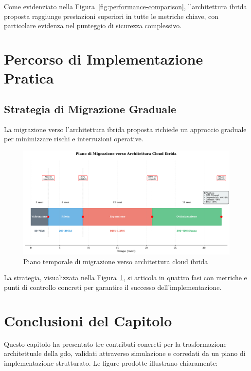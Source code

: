 Come evidenziato nella Figura~\ref{fig:performance-comparison}, l'architettura ibrida proposta raggiunge prestazioni superiori in tutte le metriche chiave, con particolare evidenza nel punteggio di sicurezza complessivo.

\section{Percorso di Implementazione Pratica}
\label{sec:implementazione}

\subsection{Strategia di Migrazione Graduale}
\label{subsec:migrazione-graduale}

La migrazione verso l'architettura ibrida proposta richiede un approccio graduale per minimizzare rischi e interruzioni operative.

\begin{figure}[htbp]
\centering
\includegraphics[width=\textwidth]{thesis_figures/cap4/fig_3_5_migration_timeline.pdf}
\caption{Piano temporale di migrazione verso architettura cloud ibrida}
\label{fig:migration-timeline}
\end{figure}

La strategia, visualizzata nella Figura~\ref{fig:migration-timeline}, si articola in quattro fasi con metriche e punti di controllo concreti per garantire il successo dell'implementazione.

\section{Conclusioni del Capitolo}
\label{sec:conclusioni-cap3}

Questo capitolo ha presentato tre contributi concreti per la trasformazione architettuale della \gls{gdo}, validati attraverso simulazione e corredati da un piano di implementazione strutturato. Le figure prodotte illustrano chiaramente:

